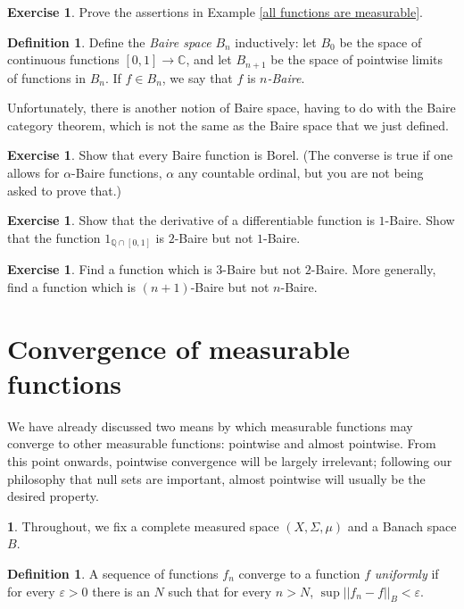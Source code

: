 \documentclass[12pt]{book}
\newcommand{\QQ}{\mathbb{Q}}
\newcommand{\CC}{\mathbb{C}}
\newcommand{\dfn}[1]{\emph{#1}\index{#1}}
\theoremstyle{definition}
\newtheorem{subsec}[theorem]{}
\newtheorem{definition}[theorem]{Definition}
\newtheorem{exercise}[theorem]{Exercise}
\begin{document}
\begin{exercise}
\label{all functions are measurable exer}
Prove the assertions in Example \ref{all functions are measurable}.
\end{exercise}

\begin{definition}
Define the \dfn{Baire space} $B_n$ inductively: let $B_0$ be the space of continuous functions $[0, 1] \to \CC$, and let $B_{n+1}$ be the space of pointwise limits of functions in $B_n$.
If $f \in B_n$, we say that $f$ is \dfn{$n$-Baire}.

Unfortunately, there is another notion of Baire space, having to do with the Baire category theorem, which is not the same as the Baire space that we just defined.
\end{definition}

\begin{exercise}
Show that every Baire function is Borel.
(The converse is true if one allows for $\alpha$-Baire functions, $\alpha$ any countable ordinal, but you are not being asked to prove that.)
\end{exercise}

\begin{exercise}
Show that the derivative of a differentiable function is $1$-Baire.
Show that the function $1_{\QQ \cap [0, 1]}$ is $2$-Baire but not $1$-Baire.
\end{exercise}

\begin{exercise}
Find a function which is $3$-Baire but not $2$-Baire. More generally, find a function which is $(n+1)$-Baire but not $n$-Baire.
\end{exercise}

\section{Convergence of measurable functions}
We have already discussed two means by which measurable functions may converge to other measurable functions: pointwise and almost pointwise.
From this point onwards, pointwise convergence will be largely irrelevant; following our philosophy that null sets are important, almost pointwise will usually be the desired property.

\begin{subsec}
Throughout, we fix a complete measured space $(X, \Sigma, \mu)$ and a Banach space $B$.
\end{subsec}

\begin{definition}
A sequence of functions $f_n$ converge to a function $f$ \dfn{uniformly} if for every $\varepsilon > 0$ there is an $N$ such that for every $n > N$, $\sup ||f_n - f||_B < \varepsilon$.
\end{definition}
\end{document}
